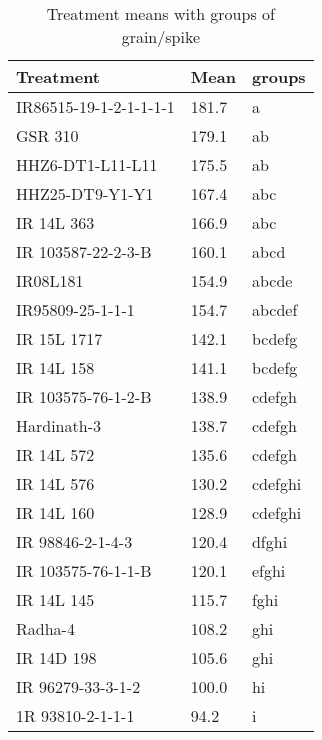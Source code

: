 \documentclass[]{article}
\begin{document}
\begin{longtable}{lll}
\caption{\label{tab:two-fac-groups-tab2}Treatment means with groups of grain/spike}\\
\toprule
Treatment & Mean & groups\\
\midrule
\rowcolor{gray!6}  IR86515-19-1-2-1-1-1-1 & 181.7 & a\\
GSR 310 & 179.1 & ab\\
\rowcolor{gray!6}  HHZ6-DT1-L11-L11 & 175.5 & ab\\
HHZ25-DT9-Y1-Y1 & 167.4 & abc\\
\rowcolor{gray!6}  IR 14L 363 & 166.9 & abc\\
\addlinespace
IR 103587-22-2-3-B & 160.1 & abcd\\
\rowcolor{gray!6}  IR08L181 & 154.9 & abcde\\
IR95809-25-1-1-1 & 154.7 & abcdef\\
\rowcolor{gray!6}  IR 15L 1717 & 142.1 & bcdefg\\
IR 14L 158 & 141.1 & bcdefg\\
\addlinespace
\rowcolor{gray!6}  IR 103575-76-1-2-B & 138.9 & cdefgh\\
Hardinath-3 & 138.7 & cdefgh\\
\rowcolor{gray!6}  IR 14L 572 & 135.6 & cdefgh\\
IR 14L 576 & 130.2 & cdefghi\\
\rowcolor{gray!6}  IR 14L 160 & 128.9 & cdefghi\\
\addlinespace
IR 98846-2-1-4-3 & 120.4 & dfghi\\
\rowcolor{gray!6}  IR 103575-76-1-1-B & 120.1 & efghi\\
IR 14L 145 & 115.7 & fghi\\
\rowcolor{gray!6}  Radha-4 & 108.2 & ghi\\
IR 14D 198 & 105.6 & ghi\\
\addlinespace
\rowcolor{gray!6}  IR 96279-33-3-1-2 & 100.0 & hi\\
1R 93810-2-1-1-1 & 94.2 & i\\
\bottomrule
\end{longtable}
\endgroup{}
\begingroup\fontsize{12}{14}\selectfont
\end{document}
